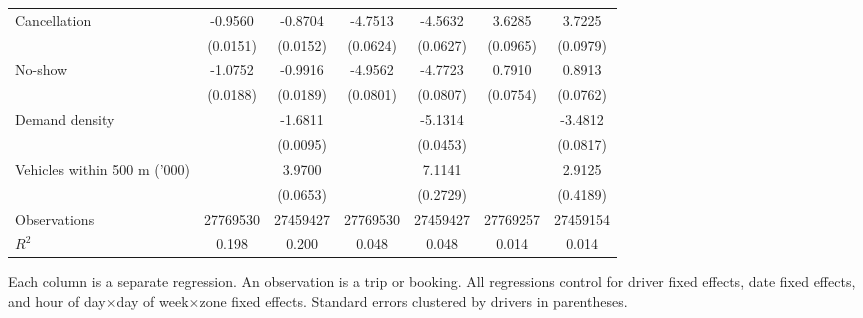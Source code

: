 \documentclass[reviewmode]{restat}
\begin{document}
\begin{table}
{\begin{tabularx}{\textwidth}{l@{\extracolsep{\fill}}*{6}{S}}
		\midrule
		Cancellation        &     -0.9560&     -0.8704&     -4.7513&     -4.5632&      3.6285&      3.7225\\
		                    &    (0.0151)         &    (0.0152)         &    (0.0624)         &    (0.0627)         &    (0.0965)         &    (0.0979)         \\
		\addlinespace
		No-show             &     -1.0752&     -0.9916&     -4.9562&     -4.7723&      0.7910&      0.8913\\
		                    &    (0.0188)         &    (0.0189)         &    (0.0801)         &    (0.0807)         &    (0.0754)         &    (0.0762)         \\
		\addlinespace
		Demand density      &                     &     -1.6811&                     &     -5.1314&                     &     -3.4812\\
		                    &                     &    (0.0095)         &                     &    (0.0453)         &                     &    (0.0817)         \\
		\addlinespace
		Vehicles within 500 m ('000)&                     &      3.9700&                     &      7.1141&                     &      2.9125\\
		                    &                     &    (0.0653)         &                     &    (0.2729)         &                     &    (0.4189)         \\
		\addlinespace
		Observations        &\num{27769530}         &\num{27459427}         &\num{27769530}         &\num{27459427}         &\num{27769257}         &\num{27459154}         \\
		\(R^2\)             &     {0.198}         &     {0.200}         &     {0.048}         &     {0.048}         &     {0.014}         &     {0.014}         \\
		\bottomrule
		\end{tabularx}
		}
		
		\begin{tablenotes}
			Each column is a separate regression. An observation is a trip or booking. All regressions control for driver fixed effects, date fixed effects, and hour of day\(\times\)day of week\(\times\)zone fixed effects. Standard errors clustered by drivers in parentheses. 
		\end{tablenotes}
\end{table}
\end{document}
